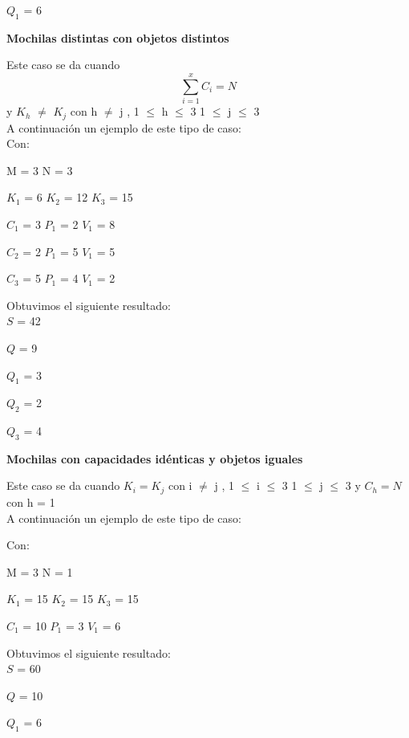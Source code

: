 $Q_{1}$ = 6


\begin{center}
 \textbf{Mochilas distintas con objetos distintos}
\end{center}

Este caso se da cuando \[
\sum_{i=1}^{x}C_{i}=N 
\]  y $K_{h}$ $\neq$ $K_{j}$ con h $\neq$ j , 1 $\leq$ h $\leq$ 3  1 $\leq$ j $\leq$ 3 \\

A continuaci\'on un ejemplo de este tipo de caso:\\

 Con:
 
 M = 3 N = 3
 
 $K_{1}$ = 6  $K_{2}$ = 12  $K_{3}$ = 15
 
 $C_{1}$ = 3 $P_{1}$ = 2 $V_{1}$ = 8
 
 $C_{2}$ = 2 $P_{1}$ = 5 $V_{1}$ = 5
 
 $C_{3}$ = 5 $P_{1}$ = 4 $V_{1}$ = 2
  
  \indent  
  
  Obtuvimos el siguiente resultado:\\

$S$ = 42

$Q$ = 9

$Q_{1}$ = 3

$Q_{2}$ = 2

$Q_{3}$ = 4


\begin{center}
 \textbf{Mochilas con capacidades id\'enticas y objetos iguales}
\end{center}

Este caso se da cuando $K_{i} = K_{j}$ con i $\neq$ j , 1 $\leq$ i $\leq$ 3  1 $\leq$ j $\leq$ 3  y $C_{h} = N$ con h = 1\\

A continuaci\'on un ejemplo de este tipo de caso:

 Con:
 
 M = 3 N = 1
 
 $K_{1}$ = 15  $K_{2}$ = 15  $K_{3}$ = 15
 
 $C_{1}$ = 10 $P_{1}$ = 3 $V_{1}$ = 6
 
  \indent  
  
  Obtuvimos el siguiente resultado:\\

$S$ = 60

$Q$ = 10

$Q_{1}$ = 6